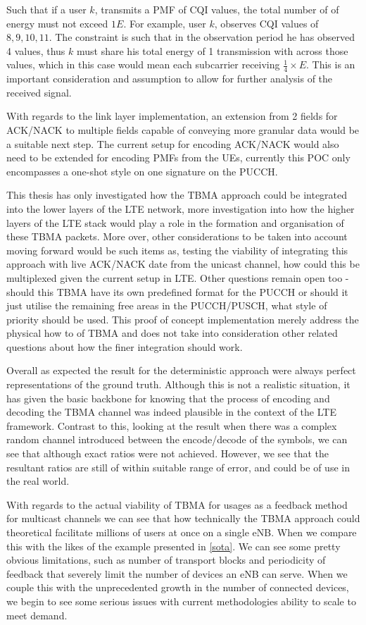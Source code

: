 \documentclass{article}
\begin{document}
Such that if a user $k$, transmits a PMF of CQI values, the total number of of energy must not exceed $1E$. For example, user $k$, observes \ac{CQI} values of $8,9,10,11$. The constraint is such that in the observation period he has observed 4 values, thus $k$ must share his total energy of 1 transmission with across those values, which in this case would mean each subcarrier receiving $\frac{1}{4} \times E$. This is an important consideration and assumption to allow for further analysis of the received signal. 

With regards to the link layer implementation, an extension from 2 fields for ACK/NACK to multiple fields capable of conveying more granular data would be a suitable next step. The current setup for encoding ACK/NACK would also need to be extended for encoding PMFs from the UEs, currently this POC only encompasses a one-shot style on one signature on the PUCCH. 

This thesis has only investigated how the TBMA approach could be integrated into the lower layers of the LTE network, more investigation into how the higher layers of the LTE stack would play a role in the formation and organisation of these TBMA packets. More over, other considerations to be taken into account moving forward would be such items as, testing the viability of integrating this approach with live ACK/NACK date from the unicast channel, how could this be multiplexed given the current setup in LTE. Other questions remain open too - should this TBMA have its own predefined format for the PUCCH or should it just utilise the remaining free areas in the PUCCH/PUSCH, what style of priority should be used. This proof of concept implementation merely address the physical how to of TBMA and does not take into consideration other related questions about how the finer integration should work.


Overall as expected the result for the deterministic approach were always perfect representations of the ground truth. Although this is not a realistic situation, it has given the basic backbone for knowing that the process of encoding and decoding the TBMA channel was indeed plausible in the context of the LTE framework. Contrast to this, looking at the result when there was a complex random channel introduced between the encode/decode of the symbols, we can see that although exact ratios were not achieved. However, we see that the resultant ratios are still of within suitable range of error, and could be of use in the real world. 

With regards to the actual viability of \ac{TBMA} for usages as a feedback method for multicast channels we can see that how technically the TBMA approach could theoretical facilitate millions of users at once on a single \ac{eNB}. When we compare this with the likes of the example presented in \cref{sota}. We can see some pretty obvious limitations, such as number of transport blocks and periodicity of feedback that severely limit the number of devices an \ac{eNB} can serve. When we couple this with the unprecedented growth in the number of connected devices, we begin to see some serious issues with current methodologies ability to scale to meet demand. 
\end{document}
